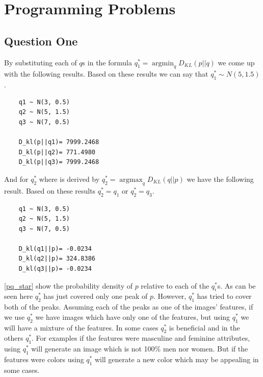 \documentclass[12pt, a4paper]{book}
\DeclareMathOperator*{\argmax}{argmax}
\DeclareMathOperator*{\argmin}{argmin}
\begin{document}
\clearpage
\section*{Programming Problems}

\subsection*{Question One}

By substituting each of $q$s in the formula $q_1^*=\argmin_q D_{KL}(p||q)$ we come up with
the following results. Based on these results we can say that $q_1^* \sim N(5, 1.5)$.

\begin{mdframed}
    \begin{verbatim}
    q1 ~ N(3, 0.5)
    q2 ~ N(5, 1.5)
    q3 ~ N(7, 0.5)

    D_kl(p||q1)= 7999.2468
    D_kl(p||q2)= 771.4980
    D_kl(p||q3)= 7999.2468
    \end{verbatim}
\end{mdframed}

And for $q_2^*$ where is derived by $q_2^*=\argmax_q D_{KL}(q||p)$ we have the following result.
Based on these results $q_2^*=q_1$ or $q_2^*=q_3$.

\begin{mdframed}
    \begin{verbatim}
    q1 ~ N(3, 0.5)
    q2 ~ N(5, 1.5)
    q3 ~ N(7, 0.5)

    D_kl(q1||p)= -0.0234
    D_kl(q2||p)= 324.8386
    D_kl(q3||p)= -0.0234
    \end{verbatim}
\end{mdframed}

\autoref{pq_star} show the probability density of $p$ relative to each of the $q_i^*$s.
As can be seen here $q_2^*$ has just covered only one peak of $p$. However, $q_1^*$ has tried
to cover both of the peaks. Assuming each of the peaks as one of the images' features,
if we use $q_2^*$ we have images which have only one of the features, but using
$q_1^*$ we will have a mixture of the features. In some cases $q_2^*$ is beneficial
and in the others $q_1^*$. For examples if the features were masculine and feminine attributes,
using $q_1^*$ will generate an image which is not 100\% men nor women. But if the features
were colors using $q_1^*$ will generate a new color which may be appealing in some cases.
\end{document}

